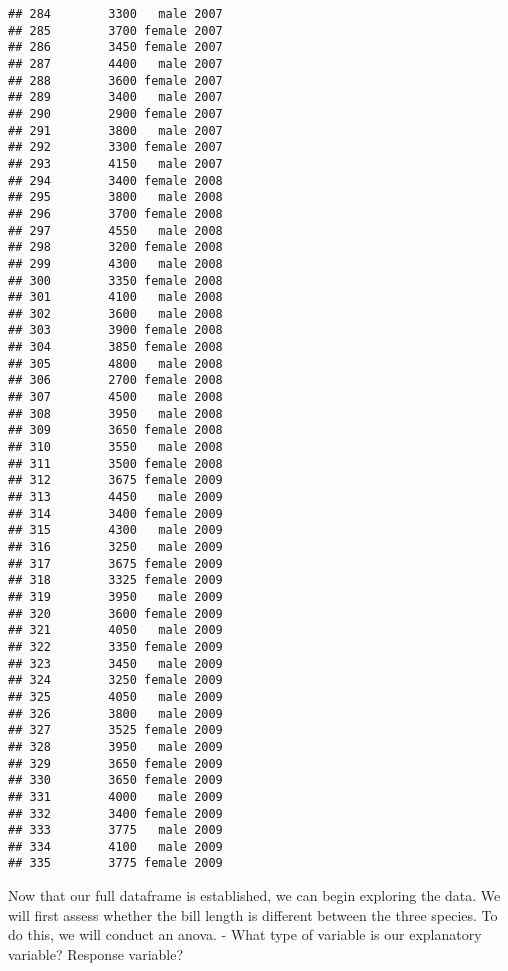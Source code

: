 \documentclass[
]{article}
\newenvironment{Shaded}{\begin{snugshade}}{\end{snugshade}}
\newcommand{\AttributeTok}[1]{\textcolor[rgb]{0.13,0.29,0.53}{#1}}
\newcommand{\FunctionTok}[1]{\textcolor[rgb]{0.13,0.29,0.53}{\textbf{#1}}}
\newcommand{\NormalTok}[1]{#1}
\newcommand{\OtherTok}[1]{\textcolor[rgb]{0.56,0.35,0.01}{#1}}
\newcommand{\SpecialCharTok}[1]{\textcolor[rgb]{0.81,0.36,0.00}{\textbf{#1}}}
\begin{document}
\begin{verbatim}
## 284        3300   male 2007
## 285        3700 female 2007
## 286        3450 female 2007
## 287        4400   male 2007
## 288        3600 female 2007
## 289        3400   male 2007
## 290        2900 female 2007
## 291        3800   male 2007
## 292        3300 female 2007
## 293        4150   male 2007
## 294        3400 female 2008
## 295        3800   male 2008
## 296        3700 female 2008
## 297        4550   male 2008
## 298        3200 female 2008
## 299        4300   male 2008
## 300        3350 female 2008
## 301        4100   male 2008
## 302        3600   male 2008
## 303        3900 female 2008
## 304        3850 female 2008
## 305        4800   male 2008
## 306        2700 female 2008
## 307        4500   male 2008
## 308        3950   male 2008
## 309        3650 female 2008
## 310        3550   male 2008
## 311        3500 female 2008
## 312        3675 female 2009
## 313        4450   male 2009
## 314        3400 female 2009
## 315        4300   male 2009
## 316        3250   male 2009
## 317        3675 female 2009
## 318        3325 female 2009
## 319        3950   male 2009
## 320        3600 female 2009
## 321        4050   male 2009
## 322        3350 female 2009
## 323        3450   male 2009
## 324        3250 female 2009
## 325        4050   male 2009
## 326        3800   male 2009
## 327        3525 female 2009
## 328        3950   male 2009
## 329        3650 female 2009
## 330        3650 female 2009
## 331        4000   male 2009
## 332        3400 female 2009
## 333        3775   male 2009
## 334        4100   male 2009
## 335        3775 female 2009
\end{verbatim}

Now that our full dataframe is established, we can begin exploring the
data. We will first assess whether the bill length is different between
the three species. To do this, we will conduct an anova. - What type of
variable is our explanatory variable? Response variable?

\begin{Shaded}
\end{Shaded}
\end{document}
